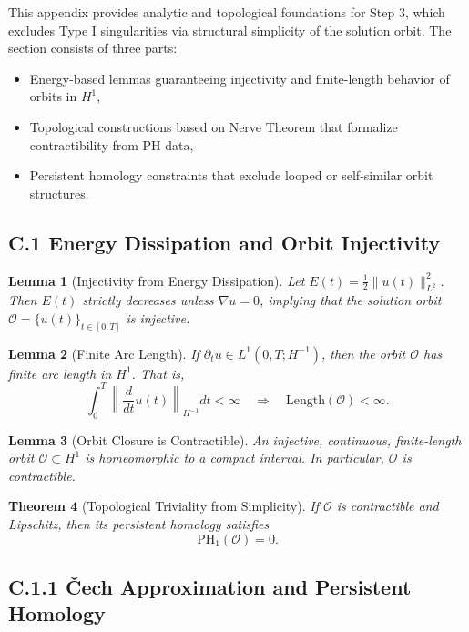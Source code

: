 \documentclass[11pt]{article}
\newtheorem{theorem}{Theorem}[section]
\newtheorem{lemma}[theorem]{Lemma}
\theoremstyle{definition}
\begin{document}
This appendix provides analytic and topological foundations for Step 3, which excludes Type I singularities via structural simplicity of the solution orbit. The section consists of three parts:
\begin{itemize}
  \item[\textbf{C.1}] Energy-based lemmas guaranteeing injectivity and finite-length behavior of orbits in \( H^1 \),
  \item[\textbf{C.2}] Topological constructions based on Nerve Theorem that formalize contractibility from PH data,
  \item[\textbf{C.3}] Persistent homology constraints that exclude looped or self-similar orbit structures.
\end{itemize}

\subsection*{C.1 Energy Dissipation and Orbit Injectivity}

\begin{lemma}[Injectivity from Energy Dissipation]
Let \( E(t) = \frac{1}{2} \|u(t)\|_{L^2}^2 \). Then \( E(t) \) strictly decreases unless \( \nabla u = 0 \), implying that the solution orbit \( \mathcal{O} = \{ u(t) \}_{t \in [0,T]} \) is injective.
\end{lemma}

\begin{lemma}[Finite Arc Length]
If \( \partial_t u \in L^1(0, T; H^{-1}) \), then the orbit \( \mathcal{O} \) has finite arc length in \( H^1 \). That is,
\[
\int_0^T \left\| \frac{d}{dt} u(t) \right\|_{H^{-1}} dt < \infty \quad \Rightarrow \quad \text{Length}(\mathcal{O}) < \infty.
\]
\end{lemma}

\begin{lemma}[Orbit Closure is Contractible]
An injective, continuous, finite-length orbit \( \mathcal{O} \subset H^1 \) is homeomorphic to a compact interval. In particular, \( \mathcal{O} \) is contractible.
\end{lemma}

\begin{theorem}[Topological Triviality from Simplicity]
If \( \mathcal{O} \) is contractible and Lipschitz, then its persistent homology satisfies
\[
\mathrm{PH}_1(\mathcal{O}) = 0.
\]
\end{theorem}

\subsection*{C.1.1 Čech Approximation and Persistent Homology}
\end{document}
